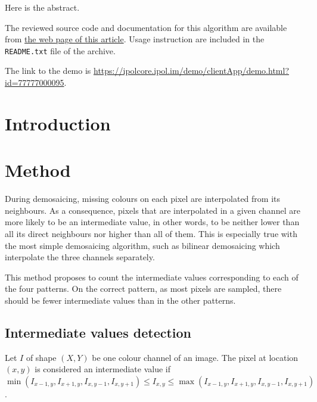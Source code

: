 \documentclass{ipol}
\begin{document}
\begin{ipolAbstract}
Here is the abstract.
\end{ipolAbstract}

\begin{ipolCode}
The reviewed source code and documentation for this algorithm are
available from \href{\ipolLink}{the web page of this
article}. Usage instruction are included in the
\verb|README.txt| file of the archive.
\end{ipolCode}

\begin{ipolSupp}
The link to the demo is \href{https://ipolcore.ipol.im/demo/clientApp/demo.html?id=77777000095}{https://ipolcore.ipol.im/demo/clientApp/demo.html?id=77777000095}.
\end{ipolSupp}

\newpage

\section{Introduction}

\section{Method}
During demosaicing, missing colours on each pixel are interpolated from its neighbours. As a consequence, pixels that are interpolated in a given channel are more likely to be an intermediate value, in other words, to be neither lower than all its direct neighbours nor higher than all of them. This is especially true with the most simple demosaicing algorithm, such as bilinear demosaicing which interpolate the three channels separately.

This method proposes to count the intermediate values corresponding to each of the four patterns. On the correct pattern, as most pixels are sampled, there should be fewer intermediate values than in the other patterns.

\subsection{Intermediate values detection}
Let $I$ of shape $(X, Y)$ be one colour channel of an image. The pixel at location $(x, y)$ is considered an intermediate value if $\min(I_{x-1, y}, I_{x+1, y}, I_{x, y-1}, I_{x, y+1}) \leq I_{x, y} \leq \max(I_{x-1, y}, I_{x+1, y}, I_{x, y-1}, I_{x, y+1})$.
\end{document}
